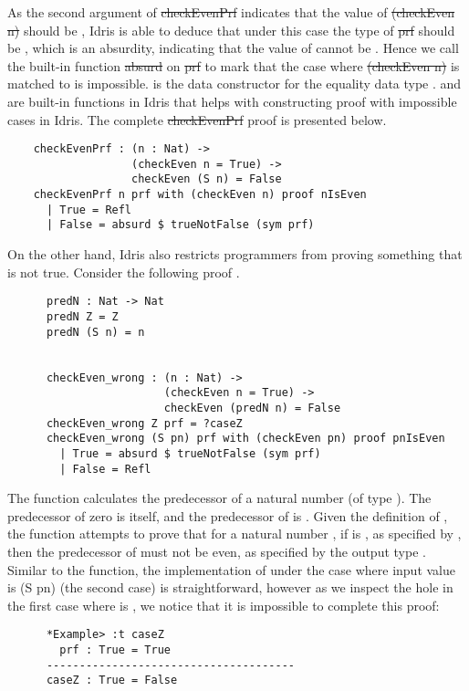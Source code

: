 As the second argument of \st{checkEvenPrf} indicates that the value of \st{(checkEven n)} should be , Idris is able to deduce that under this case the type of \st{prf} should be , which is an absurdity, indicating that the value of  cannot be . Hence we call the built-in function \st{absurd} on \st{prf} to mark that the case where \st{(checkEven n)} is matched to  is impossible.  is the data constructor for the equality data type \inl{(=)}.  and  are built-in functions in Idris that helps with constructing proof with impossible cases in Idris. The complete \st{checkEvenPrf} proof is presented below. 
\begin{lstlisting}
    checkEvenPrf : (n : Nat) -> 
                   (checkEven n = True) -> 
                   checkEven (S n) = False
    checkEvenPrf n prf with (checkEven n) proof nIsEven
      | True = Refl
      | False = absurd $ trueNotFalse (sym prf)
\end{lstlisting}

On the other hand, Idris also restricts programmers from proving something that is not true. Consider the following proof . 
\begin{lstlisting}
      predN : Nat -> Nat
      predN Z = Z
      predN (S n) = n


      checkEven_wrong : (n : Nat) -> 
                        (checkEven n = True) -> 
                        checkEven (predN n) = False
      checkEven_wrong Z prf = ?caseZ   
      checkEven_wrong (S pn) prf with (checkEven pn) proof pnIsEven
        | True = absurd $ trueNotFalse (sym prf)
        | False = Refl
\end{lstlisting}

The  function calculates the predecessor of a natural number (of type ). The predecessor of zero  is  itself, and the predecessor of  is . Given the definition of , the function  attempts to prove that for a natural number , if  is , as specified by , then the predecessor of  must not be even, as specified by the output type . Similar to the  function, the implementation of  under the case where input value  is {(S pn)} (the second case) is straightforward, however as we inspect the hole  in the first case where  is , we notice that it is impossible to complete this proof: 
\begin{lstlisting}
      *Example> :t caseZ
        prf : True = True
      --------------------------------------
      caseZ : True = False
\end{lstlisting}

